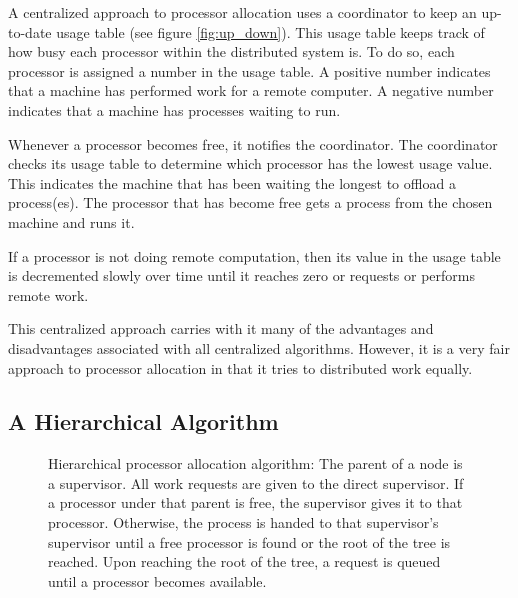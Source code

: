 \documentclass{report}
\begin{document}
A centralized approach to processor allocation uses a coordinator to keep an
up-to-date usage table (see figure \ref{fig:up_down}).  This usage table
keeps track of how busy each processor within the distributed system is.  To
do so, each processor is assigned a number in the usage table.  A positive
number indicates that a machine has performed work for a remote computer.  A
negative number indicates that a machine has processes waiting to run.

Whenever a processor becomes free, it notifies the coordinator.  The
coordinator checks its usage table to determine which processor has the
lowest usage value.  This indicates the machine that has been waiting the
longest to offload a process(es).   The processor that has become free gets
a process from the chosen machine and runs it. 

If a processor is not doing remote computation, then its value in the usage
table is decremented slowly over time until it reaches zero or requests or
performs remote work.

This centralized approach carries with it many of the advantages and
disadvantages associated with all centralized algorithms.  However, it
is a very fair approach to processor allocation in that it tries to
distributed work equally.



\subsection{A Hierarchical Algorithm \cite{Wittie}}

\begin{figure}
	\caption[Hierarchical Algorithm]{Hierarchical processor allocation
	algorithm: The parent of a node is a supervisor.  All work requests
	are given to the direct supervisor.  If a processor under that
	parent is free, the supervisor gives it to that processor.
	Otherwise, the process is handed to that supervisor's supervisor
	until a free processor is found or the root of the tree is reached.
	Upon reaching the root of the tree, a request is queued until a
	processor becomes available.}  \label{fig:hier}
\end{figure}
\end{document}
